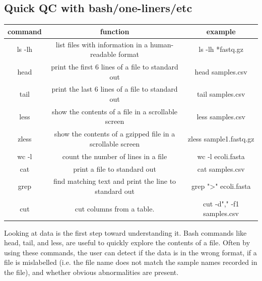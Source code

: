 \documentclass[10pt,letterpaper]{article}
\begin{document}
\begin{greybox}{\subsection*{Quick QC with bash/one-liners/etc}

\begin{tabular}{|c|c|c|}
\hline
\textbf{command} & \textbf{function} & \textbf{example} \\
\hline
ls -lh & list files with information in a human-readable format & ls -lh *fastq.gz \\
\hline
head & print the first 6 lines of a file to standard out & head samples.csv \\
\hline
tail & print the last 6 lines of a file to standard out & tail samples.csv \\
\hline
less & show the contents of a file in a scrollable screen & less samples.csv \\
\hline
zless & show the contents of a gzipped file in a scrollable screen & zless sample1.fastq.gz \\
\hline
wc -l & count the number of lines in a file & wc -l ecoli.fasta \\
\hline
cat & print a file to standard out & cat samples.csv \\
\hline
grep & find matching text and print the line to standard out & grep ">" ecoli.fasta \\
\hline
cut & cut columns from a table. & cut -d"," -f1 samples.csv \\
\hline
\end{tabular} 

Looking at data is the first step toward understanding it. 
Bash commands like head, tail, and less, are useful to quickly explore the contents of a file. 
Often by using these commands, the user can detect if the data is in the wrong format, if a file is mislabelled (i.e. the file name does not match the sample names recorded in the file), and whether obvious abnormalities are present. }
\end{greybox}
\end{document}
